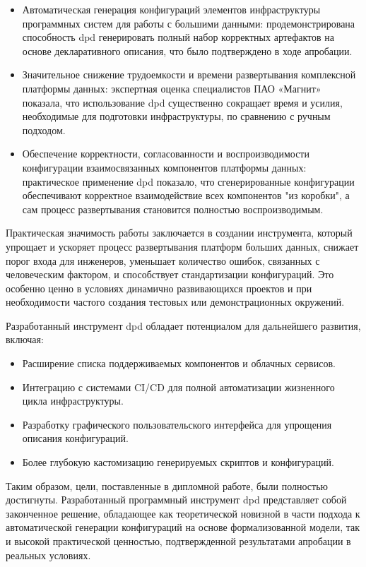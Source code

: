\begin{itemize}
    \item Автоматическая генерация конфигураций элементов инфраструктуры программных систем для работы с большими данными: продемонстрирована способность dpd генерировать полный набор корректных артефактов на основе декларативного описания, что было подтверждено в ходе апробации.
    \item Значительное снижение трудоемкости и времени развертывания комплексной платформы данных: экспертная оценка специалистов ПАО «Магнит» показала, что использование dpd существенно сокращает время и усилия, необходимые для подготовки инфраструктуры, по сравнению с ручным подходом.
    \item Обеспечение корректности, согласованности и воспроизводимости конфигурации взаимосвязанных компонентов платформы данных: практическое применение dpd показало, что сгенерированные конфигурации обеспечивают корректное взаимодействие всех компонентов "из коробки", а сам процесс развертывания становится полностью воспроизводимым.
\end{itemize}
Практическая значимость работы заключается в создании инструмента, который упрощает и ускоряет процесс развертывания платформ больших данных, снижает порог входа для инженеров, уменьшает количество ошибок, связанных с человеческим фактором, и способствует стандартизации конфигураций. Это особенно ценно в условиях динамично развивающихся проектов и при необходимости частого создания тестовых или демонстрационных окружений.


Разработанный инструмент dpd обладает потенциалом для дальнейшего развития, включая:
\begin{itemize}
    \item Расширение списка поддерживаемых компонентов и облачных сервисов.
    \item Интеграцию с системами CI/CD для полной автоматизации жизненного цикла инфраструктуры.
    \item Разработку графического пользовательского интерфейса для упрощения описания конфигураций.
    \item Более глубокую кастомизацию генерируемых скриптов и конфигураций.
\end{itemize}

Таким образом, цели, поставленные в дипломной работе, были полностью достигнуты. Разработанный программный инструмент dpd представляет собой законченное решение, обладающее как теоретической новизной в части подхода к автоматической генерации конфигураций на основе формализованной модели, так и высокой практической ценностью, подтвержденной результатами апробации в реальных условиях.



